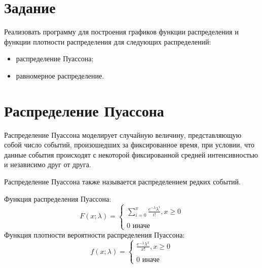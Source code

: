 \documentclass[12pt,a4paper,oneside]{report}
\begin{document}



\section*{Задание}
\quad Реализовать программу для построения графиков функции распределения и
функции плотности распределения для следующих распределений:
\begin{itemize}
    \item распределение Пуассона;
    \item равномерное распределение.
\end{itemize}

\section*{Распределение Пуассона}
\quad Распределение Пуассона моделирует случайную величину, представляющую
собой число событий, произошедших за фиксированное время, при условии, что
данные события происходят с некоторой фиксированной средней интенсивностью и независимо друг от друга.

Распределение Пуассона также называется распределением редких событий.

Функция распределения Пуассона:
\begin{equation}
    F(x;\lambda) = \begin{cases}
            \sum_{i=0}^x \frac{e^{-\lambda} \lambda^i}{i!}, x \geq 0\\\\
            0 \text{ иначе }
    \end{cases}
\end{equation}
Функция плотности вероятности распределения Пуассона:
\begin{equation}
    f(x;\lambda) = \begin{cases}
            \frac{e^{-\lambda} \lambda^x}{x!}, x \geq 0\\\\
            0 \text{ иначе }
    \end{cases}
\end{equation}
\end{document}
